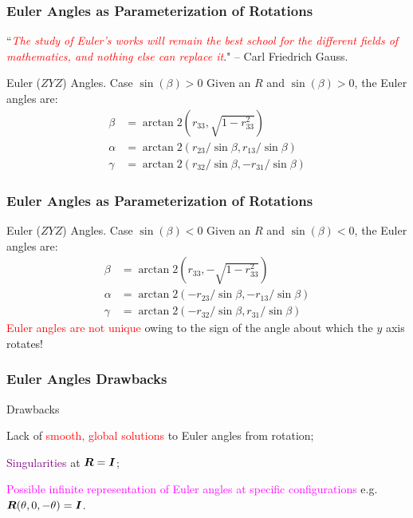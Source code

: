 \begin{frame}
	\frametitle{Euler Angles as Parameterization of Rotations}
	``\textcolor{red}{\textit{The study of Euler's works will remain the best school for the different fields of mathematics, and nothing else can replace it}}." -- Carl Friedrich Gauss.
	\begin{block}{Euler ($ZYZ$) Angles. Case $\sin(\beta)>0$}
		Given an $R$ and $\sin(\beta)>0$, the Euler angles are:
		\begin{subequations}
			\begin{align}
				\beta &= \arctan 2(r_{33}, \sqrt{1 - r_{33}^2})  \label{eq:euler_a}\\
				\alpha &= \arctan 2(r_{23}/\sin \beta, r_{13}/\sin \beta) \label{eq:euler_b} \\
				\gamma &= \arctan 2 (r_{32}/\sin \beta, -r_{31}/\sin \beta)
			\end{align}
			\label{eq:euler}
		\end{subequations}
	\end{block}
\end{frame}

\begin{frame}
	\frametitle{Euler Angles as Parameterization of Rotations}
	\begin{block}{Euler ($ZYZ$) Angles. Case $\sin(\beta)<0$}
		Given an $R$ and $\sin(\beta)<0$, the Euler angles are:
		\begin{subequations}
			\begin{align}
				\beta &=  \arctan2(r_{33}, -\sqrt{1 - r_{33}^2})  \label{eq:euler_neg_a}\\
				\alpha &= \arctan 2(-r_{23}/\sin \beta, -r_{13}/\sin \beta) \label{eq:euler_neg_b} \\
				\gamma &= \arctan 2 (-r_{32}/\sin \beta, r_{31}/\sin \beta)
			\end{align}
			\label{eq:euler_neg}
		\end{subequations}
		\footnotesize{\textcolor{red}{Euler angles are not unique} owing to the sign of the angle about which the $y$ axis rotates!}
	\end{block}
\end{frame}

\begin{frame}
	\frametitle{Euler Angles Drawbacks}
	\begin{block}{Drawbacks}
		\begin{description}
			\item Lack of \textcolor{red}{smooth, global solutions} to Euler angles from rotation;
			\item \textcolor{purple}{Singularities} at $\bm{R} = \bm{I}$;
			\item \textcolor{magenta}{Possible infinite representation of Euler angles at specific configurations} e.g. $\bm{R}(\theta, 0, -\theta)=\bm{I}$.
		\end{description}
	\end{block}
\end{frame}


